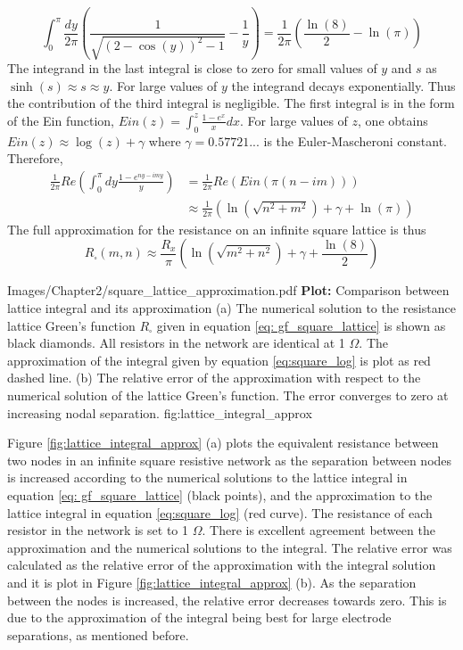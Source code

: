 \begin{equation}
\int_0^{\pi} \frac{dy}{2\pi} \left(\frac{1}{\sqrt{(2 - \cos(y))^2 - 1}} - \frac{1}{y} \right) = \frac{1}{2 \pi} \left( \frac{\ln(8)}{2} - \ln(\pi) \right)
\end{equation}
The integrand in the last integral is close to zero for small values of $y$ and $s$ as $\sinh(s) \approx s \approx y$. For large values of $y$ the integrand decays exponentially. Thus the contribution of the third integral is negligible. The first integral is in the form of the Ein function, $Ein(z) = \int_0^z \frac{1 - e^x}{x} dx$. For large values of $z$, one obtains $Ein(z) \approx \log(z) + \gamma$ where $\gamma =  0.57721...$ is the Euler-Mascheroni constant. Therefore, 
\begin{align}
\frac{1}{2 \pi} Re\left( \int_0^{\pi} dy \frac{1 - e^{ny - i my}}{y} \right) &= \frac{1}{2 \pi} Re \left( Ein(\pi(n - im)) \right) \nonumber \\
&\approx \frac{1}{2 \pi} (\ln(\sqrt{n^2 + m^2}) + \gamma + \ln(\pi))
\end{align}
The full approximation for the resistance on an infinite square lattice is thus
\begin{equation}
R_{\square}(m,n) \approx \frac{R_x}{\pi}\left( \ln (\sqrt{m^2 + n^2}) + \gamma + \frac{\ln (8)}{2} \right)
\label{eq:square_log}
\end{equation}

{Images/Chapter2/square_lattice_approximation.pdf}
{\textbf{Plot:} Comparison between lattice integral and its approximation}
{(a) The numerical solution to the resistance lattice Green's function $R_{\square}$ given in equation \ref{eq: gf_square_lattice} is shown as black diamonds. All resistors in the network are identical at 1 $\Omega$. The approximation of the integral given by equation \ref{eq:square_log} is plot as red dashed line. (b) The relative error of the approximation with respect to the numerical solution of the lattice Green's function. The error converges to zero at increasing nodal separation.}
{fig:lattice_integral_approx}

Figure \ref{fig:lattice_integral_approx} (a) plots the equivalent resistance between two nodes in an infinite square resistive network as the separation between nodes is increased according to the numerical solutions to the lattice integral in equation \ref{eq: gf_square_lattice} (black points), and the approximation to the lattice integral in equation \ref{eq:square_log} (red curve). The resistance of each resistor in the network is set to 1 $\Omega$. There is excellent agreement between the approximation and the numerical solutions to the integral. The relative error was calculated as the relative error of the approximation with the integral solution and it is plot in Figure \ref{fig:lattice_integral_approx} (b). As the separation between the nodes is increased, the relative error decreases towards zero. This is due to the approximation of the integral being best for large electrode separations, as mentioned before.

